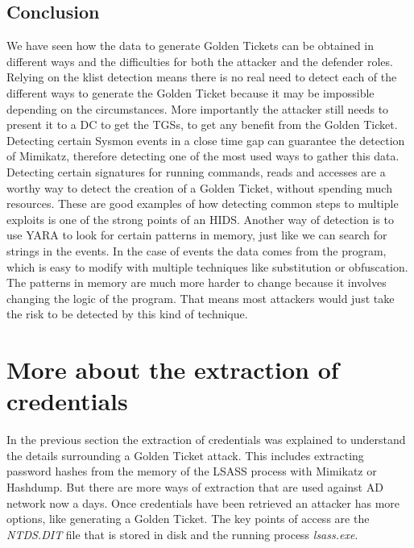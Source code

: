 \subsection{Conclusion}
We have seen how the data to generate Golden Tickets can be obtained in different ways and the difficulties for both the attacker and the defender roles.
\linej
\linej
Relying on the klist detection means there is no real need to detect each of the different ways to generate the Golden Ticket because it may be impossible depending on the circumstances. More importantly the attacker still needs to present it to a DC to get the TGSs, to get any benefit from the Golden Ticket.
\linej
Detecting certain Sysmon events in a close time gap can guarantee the detection of Mimikatz, therefore detecting one of the most used ways to gather this data. Detecting certain signatures for running commands, reads and accesses are a worthy way to detect the creation of a Golden Ticket, without spending much resources.
\linej
These are good examples of how detecting common steps to multiple exploits is one of the strong points of an HIDS.
\linej
\linej
Another way of detection is to use YARA to look for certain patterns in memory, just like we can search for strings in the events. In the case of events the data comes from the program, which is easy to modify with multiple techniques like substitution or obfuscation. The patterns in memory are much more harder to change because it involves changing the logic of the program. That means most attackers would just take the risk to be detected by this kind of technique.


\section{More about the extraction of credentials}
In the previous section the extraction of credentials was explained to understand the details surrounding a Golden Ticket attack. This includes extracting password hashes from the memory of the LSASS process with Mimikatz or Hashdump. But there are more ways of extraction that are used against AD network now a days.
\linej
Once credentials have been retrieved an attacker has more options, like generating a Golden Ticket.
The key points of access are the \textit{NTDS.DIT} file that is stored in disk and the running process \textit{lsass.exe}.

